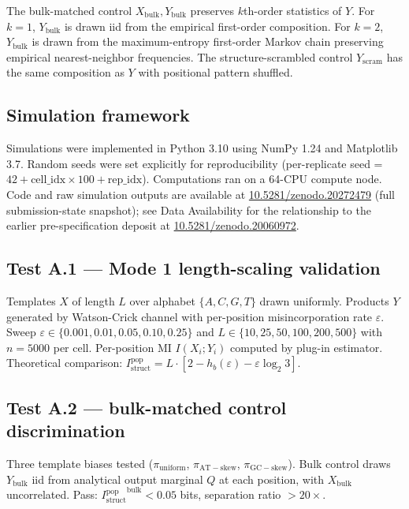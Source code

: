 \documentclass[aps,prx,reprint,amsmath,amssymb,floatfix,superscriptaddress,nofootinbib]{revtex4-2}
\newcommand{\zenodoDOI}{\href{https://doi.org/10.5281/zenodo.20060972}{10.5281/zenodo.20060972}}
\newcommand{\zenodoSubmissionDOI}{\href{https://doi.org/10.5281/zenodo.20272479}{10.5281/zenodo.20272479}}
\theoremstyle{plain-thm}
\theoremstyle{definition-thm}
\newcommand{\Istructpop}{I_{\mathrm{struct}}^{\mathrm{pop}}}
\newcommand{\Hbin}{h_b}
\begin{document}
The bulk-matched control $X_{\mathrm{bulk}}, Y_{\mathrm{bulk}}$ preserves $k$th-order statistics of $Y$. For $k = 1$, $Y_{\mathrm{bulk}}$ is drawn iid from the empirical first-order composition. For $k = 2$, $Y_{\mathrm{bulk}}$ is drawn from the maximum-entropy first-order Markov chain preserving empirical nearest-neighbor frequencies. The structure-scrambled control $Y_{\mathrm{scram}}$ has the same composition as $Y$ with positional pattern shuffled.

\subsection{Simulation framework}

Simulations were implemented in Python 3.10 using NumPy 1.24 and Matplotlib 3.7. Random seeds were set explicitly for reproducibility (per-replicate seed = $42 + \mathrm{cell\_idx} \times 100 + \mathrm{rep\_idx}$). Computations ran on a 64-CPU compute node. Code and raw simulation outputs are available at \zenodoSubmissionDOI{} (full submission-state snapshot); see Data Availability for the relationship to the earlier pre-specification deposit at \zenodoDOI{}.

\subsection{Test A.1 --- Mode 1 length-scaling validation}

Templates $X$ of length $L$ over alphabet $\{A, C, G, T\}$ drawn uniformly. Products $Y$ generated by Watson-Crick channel with per-position misincorporation rate $\varepsilon$. Sweep $\varepsilon \in \{0.001, 0.01, 0.05, 0.10, 0.25\}$ and $L \in \{10, 25, 50, 100, 200, 500\}$ with $n = 5000$ per cell. Per-position MI $I(X_i; Y_i)$ computed by plug-in estimator. Theoretical comparison: $\Istructpop = L \cdot \left[2 - \Hbin(\varepsilon) - \varepsilon \log_2 3\right]$.

\subsection{Test A.2 --- bulk-matched control discrimination}

Three template biases tested ($\pi_{\mathrm{uniform}}$, $\pi_{\mathrm{AT-skew}}$, $\pi_{\mathrm{GC-skew}}$). Bulk control draws $Y_{\mathrm{bulk}}$ iid from analytical output marginal $Q$ at each position, with $X_{\mathrm{bulk}}$ uncorrelated. Pass: ${\Istructpop}^{\mathrm{bulk}} < 0.05$ bits, separation ratio $> 20\times$.
\end{document}
